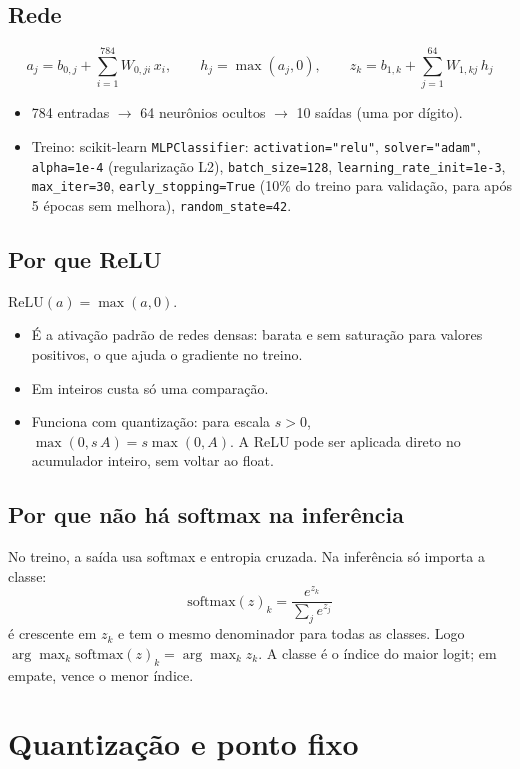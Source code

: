 \documentclass[10pt]{article}
\begin{document}
\subsection{Rede}
\[
a_j = b_{0,j} + \sum_{i=1}^{784} W_{0,ji}\, x_i,\qquad
h_j = \max(a_j, 0),\qquad
z_k = b_{1,k} + \sum_{j=1}^{64} W_{1,kj}\, h_j
\]
\begin{itemize}
\item 784 entradas $\to$ 64 neurônios ocultos $\to$ 10 saídas (uma por dígito).
\item Treino: scikit-learn \texttt{MLPClassifier}: \texttt{activation="relu"}, \texttt{solver="adam"},
      \texttt{alpha=1e-4} (regularização L2), \texttt{batch\_size=128}, \texttt{learning\_rate\_init=1e-3},
      \texttt{max\_iter=30}, \texttt{early\_stopping=True} (10\% do treino para validação, para após 5
      épocas sem melhora), \texttt{random\_state=42}.
\end{itemize}

\subsection{Por que ReLU}
$\mathrm{ReLU}(a)=\max(a,0)$.
\begin{itemize}
\item É a ativação padrão de redes densas: barata e sem saturação para valores positivos, o que
      ajuda o gradiente no treino.
\item Em inteiros custa só uma comparação.
\item Funciona com quantização: para escala $s>0$, $\max(0, s\,A) = s\max(0, A)$. A ReLU pode
      ser aplicada direto no acumulador inteiro, sem voltar ao float.
\end{itemize}

\subsection{Por que não há softmax na inferência}
No treino, a saída usa softmax e entropia cruzada. Na inferência só importa a classe:
\[
\mathrm{softmax}(z)_k = \frac{e^{z_k}}{\sum_j e^{z_j}}
\]
é crescente em $z_k$ e tem o mesmo denominador para todas as classes. Logo
$\arg\max_k \mathrm{softmax}(z)_k = \arg\max_k z_k$. A classe é o índice do maior logit; em
empate, vence o menor índice.

\section{Quantização e ponto fixo}
\end{document}
